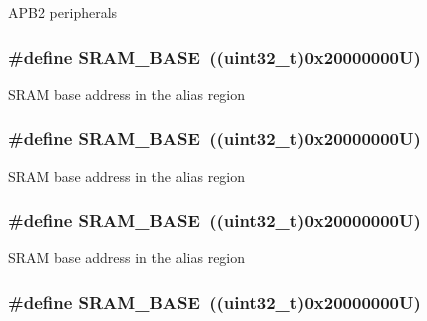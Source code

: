 A\-P\-B2 peripherals \hypertarget{group___peripheral__memory__map_ga05e8f3d2e5868754a7cd88614955aecc}{
\subsubsection[{S\-R\-A\-M\-\_\-\-B\-A\-S\-E}]{\setlength{\rightskip}{0pt plus 5cm}\#define S\-R\-A\-M\-\_\-\-B\-A\-S\-E~((uint32\-\_\-t)0x20000000\-U)}}\label{group___peripheral__memory__map_ga05e8f3d2e5868754a7cd88614955aecc}
S\-R\-A\-M base address in the alias region \hypertarget{group___peripheral__memory__map_ga05e8f3d2e5868754a7cd88614955aecc}{
\subsubsection[{S\-R\-A\-M\-\_\-\-B\-A\-S\-E}]{\setlength{\rightskip}{0pt plus 5cm}\#define S\-R\-A\-M\-\_\-\-B\-A\-S\-E~((uint32\-\_\-t)0x20000000\-U)}}\label{group___peripheral__memory__map_ga05e8f3d2e5868754a7cd88614955aecc}
S\-R\-A\-M base address in the alias region \hypertarget{group___peripheral__memory__map_ga05e8f3d2e5868754a7cd88614955aecc}{
\subsubsection[{S\-R\-A\-M\-\_\-\-B\-A\-S\-E}]{\setlength{\rightskip}{0pt plus 5cm}\#define S\-R\-A\-M\-\_\-\-B\-A\-S\-E~((uint32\-\_\-t)0x20000000\-U)}}\label{group___peripheral__memory__map_ga05e8f3d2e5868754a7cd88614955aecc}
S\-R\-A\-M base address in the alias region \hypertarget{group___peripheral__memory__map_ga05e8f3d2e5868754a7cd88614955aecc}{
\subsubsection[{S\-R\-A\-M\-\_\-\-B\-A\-S\-E}]{\setlength{\rightskip}{0pt plus 5cm}\#define S\-R\-A\-M\-\_\-\-B\-A\-S\-E~((uint32\-\_\-t)0x20000000\-U)}}\label{group___peripheral__memory__map_ga05e8f3d2e5868754a7cd88614955aecc}
